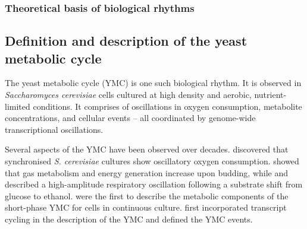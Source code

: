 \subsubsection{Theoretical basis of biological rhythms}
\label{subsubsec:intro-ymc-biological_rhythms-theoretical_basis}

\subsection{Definition and description of the yeast metabolic cycle}
\label{subsec:intro-ymc-definition}



The yeast metabolic cycle (YMC) is one such biological rhythm.
It is observed in \emph{Saccharomyces cerevisiae} cells cultured at high density and aerobic,
nutrient-limited conditions.
It comprises of oscillations in oxygen consumption, metabolite concentrations, and cellular events -- all coordinated by genome-wide transcriptional oscillations.

Several aspects of the YMC have been observed over decades.
\citet{nosohSYNCHRONIZATIONBUDDINGCYCLE1962} discovered that synchronised \emph{S. cerevisiae} cultures show oscillatory oxygen consumption.
\citet{kasparvonmeyenburgEnergeticsBuddingCycle1969} showed that gas metabolism and energy generation increase upon budding, while and \citet{mochanRespiratoryOscillationsAdapting1973} described a high-amplitude respiratory oscillation following a substrate shift from glucose to ethanol.
\citet{satroutdinovOscillatoryMetabolismSaccharomyces1992} were the first to describe the metabolic components of the short-phase YMC for cells in continuous culture.
\citet{tuLogicYeastMetabolic2005} first incorporated transcript cycling in the description of the YMC and defined the YMC events.

